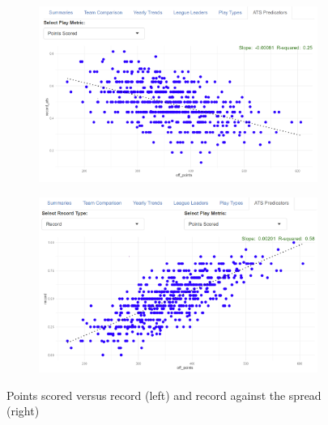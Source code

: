 \documentclass{article}
\begin{document}
\begin{figure}[H]
    \centering
    \begin{subfigure}{0.45\textwidth}
        \centering
        \includegraphics[width=\textwidth]{../screenshots/ats-trend.png}
    \end{subfigure}\hfill
    \begin{subfigure}{0.45\textwidth}
        \centering
        \includegraphics[width=\textwidth]{../screenshots/record-trend.png}
    \end{subfigure}\hfill
    \caption{Points scored versus record (left) and record against the spread (right)}
\end{figure}
\end{document}
